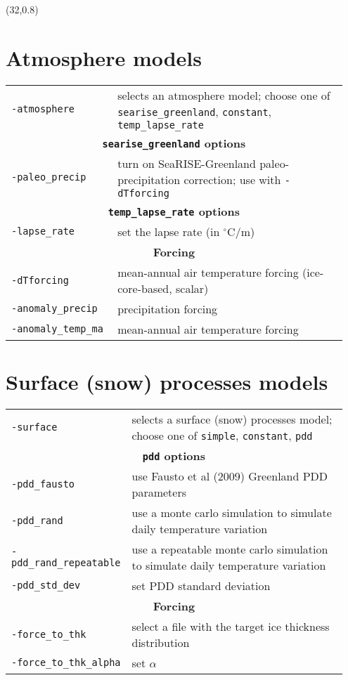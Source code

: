 \documentclass[landscape]{article}
\newcommand{\tabletitle}[1]{\multicolumn{2}{c}{\textbf{#1}}}
\begin{document}
\begin{textblock}{15}(32,0.8)


\section{Atmosphere models}
\label{sec:atmosphere-models}

\begin{tabular}{@{}p{0.3\linewidth}p{0.65\linewidth}@{}}
\texttt{-atmosphere} & selects an atmosphere model; choose one of
\mbox{\texttt{searise_greenland}}, \texttt{constant},
\mbox{\texttt{temp_lapse_rate}}\\
\tabletitle{\texttt{searise_greenland} options}\\
\texttt{-paleo_precip} & turn on SeaRISE-Greenland paleo-precipitation
correction; use with \texttt{-dTforcing}\\
\tabletitle{\texttt{temp_lapse_rate} options}\\
\texttt{-lapse_rate} & set the lapse rate (in $^{\circ}$C/m)\\
\tabletitle{Forcing} \\
\texttt{-dTforcing} & mean-annual air temperature forcing (ice-core-based,
scalar)\\
\texttt{-anomaly_precip} & precipitation forcing\\
\texttt{-anomaly_temp_ma} & mean-annual air temperature forcing\\
\end{tabular}

\section{Surface (snow) processes models}
\label{sec:surface-models}

\begin{tabular}{@{}p{0.3\linewidth}p{0.65\linewidth}@{}}
  \texttt{-surface} & selects a surface (snow) processes model; choose one of
  \texttt{simple}, \texttt{constant}, \texttt{pdd}\\
  \tabletitle{\texttt{pdd} options} \\
  \texttt{-pdd_fausto} & use Fausto et al (2009) Greenland PDD parameters\\
  \texttt{-pdd_rand} & use a monte carlo simulation to simulate daily temperature variation\\
 \texttt{-pdd_rand_repeatable} & use a repeatable monte carlo simulation to simulate daily temperature variation\\
  \texttt{-pdd_std_dev} & set PDD standard deviation\\
  \tabletitle{Forcing} \\
  \texttt{-force_to_thk} & select a file with the target ice thickness
  distribution\\
  \texttt{-force_to_thk_alpha} & set $\alpha$
\end{tabular}


\end{textblock}
\end{document}
